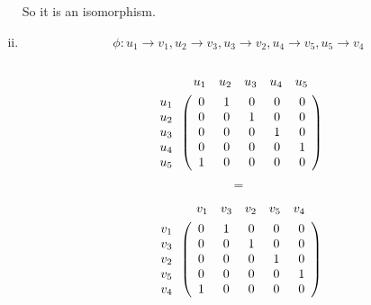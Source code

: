 \documentclass{article}
\begin{document}
\begin{enumerate}[i)]
So it is an isomorphism.
\item
$$\phi:u_1\to v_1,u_2\to v_3,u_3\to v_2,u_4\to v_5,u_5\to v_4$$
\begin{minipage}{0.1\linewidth}
$$$$
\end{minipage}
\hfill
\begin{minipage}{0.33\linewidth}
\begin{gather*}
\begin{array}{c@{\hspace{2em}}ccccc}
&u_1&u_2&u_3&u_4&u_5
\end{array}
\\
\begin{array}{c}
u_1\\u_2\\u_3\\u_4\\u_5
\end{array}\left(
\begin{array}{c@{\hspace{1.5em}}c@{\hspace{1.5em}}c@{\hspace{1.5em}}c@{\hspace{1.5em}}c}
0&1&0&0&0\\
0&0&1&0&0\\
0&0&0&1&0\\
0&0&0&0&1\\
1&0&0&0&0\\
\end{array}\right)
\end{gather*}
\end{minipage}
\hfill
\begin{minipage}{0.05\linewidth}
$$=$$
\end{minipage}
\hfill
\begin{minipage}{0.33\linewidth}
\begin{gather*}
\begin{array}{c@{\hspace{2em}}ccccc}
&v_1&v_3&v_2&v_5&v_4
\end{array}
\\
\begin{array}{c}
v_1\\v_3\\v_2\\v_5\\v_4
\end{array}\left(
\begin{array}{c@{\hspace{1.5em}}c@{\hspace{1.5em}}c@{\hspace{1.5em}}c@{\hspace{1.5em}}c}
0&1&0&0&0\\
0&0&1&0&0\\
0&0&0&1&0\\
0&0&0&0&1\\
1&0&0&0&0\\
\end{array}\right)
\end{gather*}
\end{minipage}
\hfill
\begin{minipage}{0.15\linewidth}
$$$$
\end{minipage}


\end{enumerate}
\end{document}
